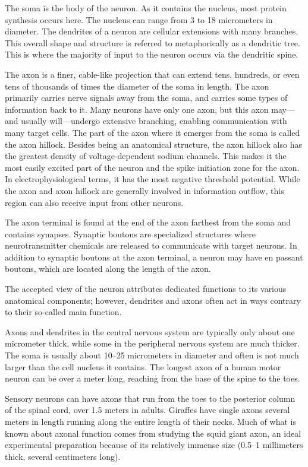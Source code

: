 The soma is the body of the neuron. As it contains the nucleus, most protein synthesis occurs here. The nucleus can range from 3 to 18 micrometers in diameter.
The dendrites of a neuron are cellular extensions with many branches. This overall shape and structure is referred to metaphorically as a dendritic tree. This is where the majority of input to the neuron occurs via the dendritic spine.

The axon is a finer, cable-like projection that can extend tens, hundreds, or even tens of thousands of times the diameter of the soma in length. The axon primarily carries nerve signals away from the soma, and carries some types of information back to it. Many neurons have only one axon, but this axon may---and usually will---undergo extensive branching, enabling communication with many target cells. The part of the axon where it emerges from the soma is called the axon hillock. Besides being an anatomical structure, the axon hillock also has the greatest density of voltage-dependent sodium channels. This makes it the most easily excited part of the neuron and the spike initiation zone for the axon. In electrophysiological terms, it has the most negative threshold potential.
While the axon and axon hillock are generally involved in information outflow, this region can also receive input from other neurons.

The axon terminal is found at the end of the axon farthest from the soma and contains synapses. Synaptic boutons are specialized structures where neurotransmitter chemicals are released to communicate with target neurons. In addition to synaptic boutons at the axon terminal, a neuron may have en passant boutons, which are located along the length of the axon.

The accepted view of the neuron attributes dedicated functions to its various anatomical components; however, dendrites and axons often act in ways contrary to their so-called main function.

Axons and dendrites in the central nervous system are typically only about one micrometer thick, while some in the peripheral nervous system are much thicker. The soma is usually about 10--25 micrometers in diameter and often is not much larger than the cell nucleus it contains. The longest axon of a human motor neuron can be over a meter long, reaching from the base of the spine to the toes.

Sensory neurons can have axons that run from the toes to the posterior column of the spinal cord, over 1.5 meters in adults. Giraffes have single axons several meters in length running along the entire length of their necks. Much of what is known about axonal function comes from studying the squid giant axon, an ideal experimental preparation because of its relatively immense size (0.5--1 millimeters thick, several centimeters long).

